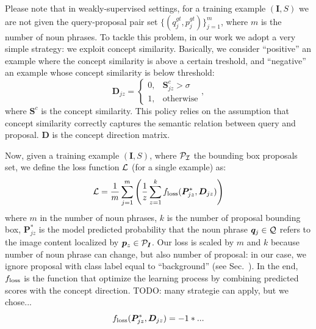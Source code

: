 Please note that in weakly-supervised settings, for a training example
$\left( \bm{I}, S \right)$ we are not given the query-proposal pair
set $\{ ( q^{gt}_j, p^{gt}_j ) \}^m_{j=1}$, where $m$ is the number of
noun phrases.
To tackle this problem, in our work we adopt a very simple strategy:
we exploit concept similarity. Basically, we consider ``positive'' an
example where the concept similarity is above a certain treshold, and
``negative'' an example whose concept similarity is below threshold:
\begin{equation}
  \bm{D}_{jz} =
  \begin{cases}
    0, & \bm{S}^c_{jz} > \sigma \\
    1, & \text{otherwise}
  \end{cases},
\end{equation}
where $\bm{S}^c$ is the concept similarity. This policy relies on the
assumption that concept similarity correctly captures the semantic
relation between query and proposal. $\bm{D}$ is the concept direction
matrix.

Now, given a training example $\left( \bm{I}, S \right)$, where
$\cal{P}_{\bm{I}}$ the bounding box proposals set, we define the loss
function $\mathcal{L}$ (for a single example) as:
\begin{equation}
  \mathcal{L} = \frac{1}{m} \sum^m_{j=1} \Bigg( \frac{1}{z} \sum^k_{z=1} f_{\text{loss}} ( \bm{P}^*_{jz}, \bm{D}_{jz} ) \Bigg)
\end{equation}
where $m$ in the number of noun phrases, $k$ is the number of proposal
bounding box, $\bm{P}^*_{jz}$ is the model predicted probability that
the noun phrase $\bm{q}_j \in \mathcal{Q}$ refers to the image content
localized by $\bm{p}_z \in \mathcal{P}_{\bm{I}}$. Our loss is scaled by $m$
and $k$ because number of noun phrase can change, but also number of
proposal: in our case, we ignore proposal with class label equal to
``background'' (see Sec.~). In the end, $f_{\text{loss}}$ is the
function that optimize the learning process by combining predicted
scores with the concept direction. TODO: many strategie can apply, but
we chose...
\begin{equation}
  \floss ( \bm{P}^*_{jz}, \bm{D}_{jz} ) = -1 * ... %
\end{equation}

